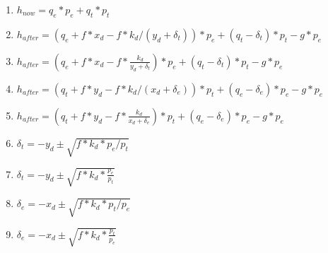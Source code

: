 \documentclass{article}
\begin{document}
\begin{enumerate}

\item $h_{now} = q_{e} \ast p_{e} + q_{t} \ast p_{t}$

\item $h_{after} = (q_{e} + f \ast x_{d}-f \ast k_d/(y_{d}+\delta_{t})) \ast p_{e} + (q_{t}-\delta_{t}) \ast p_{t} - g \ast p_e$

\item $h_{after} = \left( q_{e} + f \ast x_{d}-f \ast \frac{k_d}{y_{d}+\delta_{t}} \right) \ast p_{e} + \left( q_{t}-\delta_{t} \right) \ast p_{t} - g \ast p_e$

\item $h_{after} = (q_{t} + f \ast y_{d}-f \ast k_d/(x_{d}+\delta_{e})) \ast p_{t} + (q_{e}-\delta_{e}) \ast p_{e} - g \ast p_e$

\item $h_{after} = \left( q_{t} + f \ast y_{d}-f \ast \frac{k_d}{x_{d}+\delta_{e}} \right) \ast p_{t} + \left( q_{e}-\delta_{e} \right) \ast p_{e} - g \ast p_e$

\item $\delta_{t}=-y_d\pm\sqrt{f \ast k_d \ast p_e/p_t}$

\item $\delta_{t}=-y_d\pm\sqrt{f \ast k_d \ast \frac{p_e}{p_t}}$

\item $\delta_{e}=-x_d\pm\sqrt{f \ast k_d \ast p_t/p_e}$

\item $\delta_{e}=-x_d\pm\sqrt{f \ast k_d \ast \frac{p_t}{p_e}}$

\end{enumerate}
\end{document}
